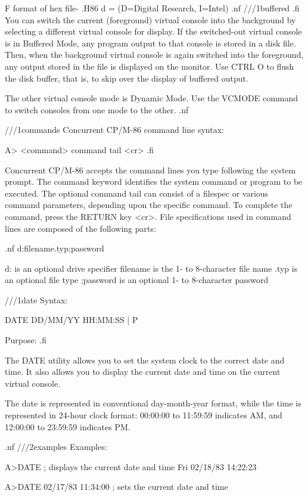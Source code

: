 F   format of hex file- .H86
d = (D=Digital Research, I=Intel)
.nf
///1buffered 
.fi
You can switch the current (foreground) virtual console into 
the background by selecting a different virtual console for display. 
If the switched-out virtual console is in Buffered Mode, any program 
output  to  that console is stored in a disk file. 
Then, when the 
background virtual console is again switched into the foreground, 
any output stored in the file is displayed on the monitor.
Use CTRL O to flush the disk buffer, that is, to skip over
the display of buffered output.

The other virtual console mode is Dynamic Mode.  Use the VCMODE 
command to switch consoles from one mode to the other.
.nf

///1commands
Concurrent CP/M-86 command line syntax:

A> <command> {command tail} <cr>
.fi

Concurrent CP/M-86 accepts the command lines you type following the
system prompt.  The command keyword identifies the system command 
or program to be executed. The optional command tail can consist of 
a filespec or various command parameters, depending upon the specific
command. To complete the command, press the RETURN key <cr>. File 
specifications used in command lines are composed of the following 
parts:

.nf
        {d:}filename{.typ}{;password}

        d:              is an optional drive specifier
        filename        is the 1- to 8-character file name
        .typ            is an optional file type
        ;password       is an optional 1- to 8-character password

///1date
Syntax:

DATE {DD/MM/YY HH:MM:SS | P}

Purpose:
.fi

The DATE utility allows you to set the system clock to the correct 
date and time. It also allows you to display the current date and 
time on the current virtual console. 

The date is represented in conventional day-month-year format, while 
the time is represented in 24-hour clock format: 00:00:00 to 11:59:59
indicates AM, and 12:00:00 to 23:59:59 indicates PM.

.nf
///2examples
Examples:

      A>DATE                ; displays the current date and time 
      Fri 02/18/83  14:22:23

      A>DATE 02/17/83  11:34:00 ; sets the current date and time

